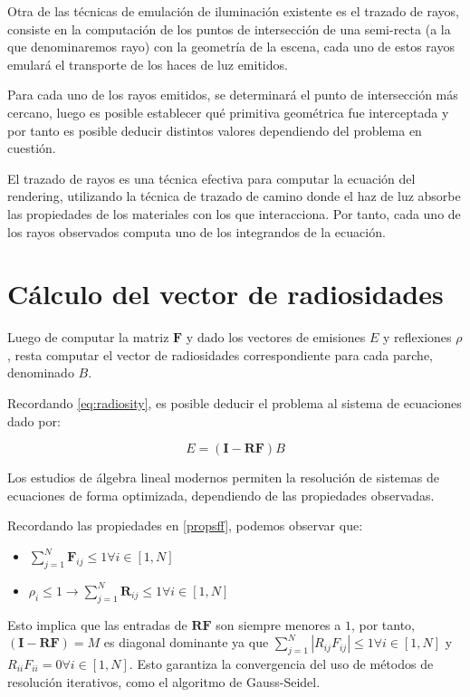 Otra de las técnicas de emulación de iluminación existente es el trazado de rayos, consiste en la computación de los puntos de intersección de una semi-recta (a la que denominaremos rayo) con la geometría de la escena, cada uno de estos rayos emulará el transporte de los haces de luz emitidos.

Para cada uno de los rayos emitidos, se determinará el punto de intersección más cercano, luego es posible establecer qué primitiva geométrica fue interceptada y por tanto es posible deducir distintos valores dependiendo del problema en cuestión.

El trazado de rayos es una técnica efectiva \cite{Kajiya} para computar la ecuación del rendering, utilizando la técnica de trazado de camino donde el haz de luz absorbe las propiedades de los materiales con los que interacciona. Por tanto, cada uno de los rayos observados computa uno de los integrandos de la ecuación.

\section{Cálculo del vector de radiosidades}

Luego de computar la matriz $\mathbf{F}$ y dado los vectores de emisiones $E$ y reflexiones $\rho$, resta computar el vector de radiosidades correspondiente para cada parche, denominado $B$.

Recordando \eqref{eq:radiosity}, es posible deducir el problema al sistema de ecuaciones dado por:

\begin{equation}
	E = (\mathbf{I} - \mathbf{RF})B
\end{equation}

Los estudios de álgebra lineal modernos permiten la resolución de sistemas de ecuaciones de forma optimizada, dependiendo de las propiedades observadas.

Recordando las propiedades en \ref{propsff}, podemos observar que:

\begin{itemize}
	\item $\sum_{j=1}^{N} \mathbf{F}_{ij} \leq 1 \forall{i \in [1,N]}$
	\item $\rho_{i} \leq 1 \rightarrow \sum_{j=1}^{N} \mathbf{R}_{ij} \leq 1 \forall{i \in [1,N]}$
\end{itemize}

Esto implica que las entradas de $\mathbf{RF}$ son siempre menores a $1$, por tanto, $(\mathbf{I} - \mathbf{RF}) = M$ es diagonal dominante ya que $\sum_{j=1}^{N}|R_{ij}F_{ij}| \le 1 \forall i \in [1, N]$ y $R_{ii}F_{ii} = 0  \forall i \in [1,N]$. Esto garantiza la convergencia del uso de métodos de resolución iterativos, como el algoritmo de Gauss-Seidel.

